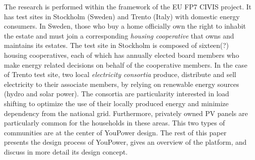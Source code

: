 The research is performed within the framework of the EU FP7 CIVIS project. It has test sites in Stockholm (Sweden) and Trento (Italy) with domestic energy consumers. 
% 
In Sweden, those who buy a home officially own the right to inhabit the estate and must join a corresponding \textit{housing cooperative} 
that owns and maintains its estates. The test site in Stockholm is composed of sixteen(?) housing cooperatives, each of which has annually elected board members who make energy related decisions on behalf of the cooperative members. 
In the case of Trento test site, two local \textit{electricity consortia} produce, distribute and sell electricity to their associate members, by relying on renewable energy sources (hydro and solar power). The consortia are particularity interested in load shifting to optimize the use of their locally produced energy and minimize dependency from the national grid. Furthermore, privately owned PV panels are particularly common for the households in these areas.  
This two types of communities are at the center of YouPower design. 
% 
The rest of this paper presents the design process of YouPower, gives an overview of the platform, and discuss in more detail its design concept.

